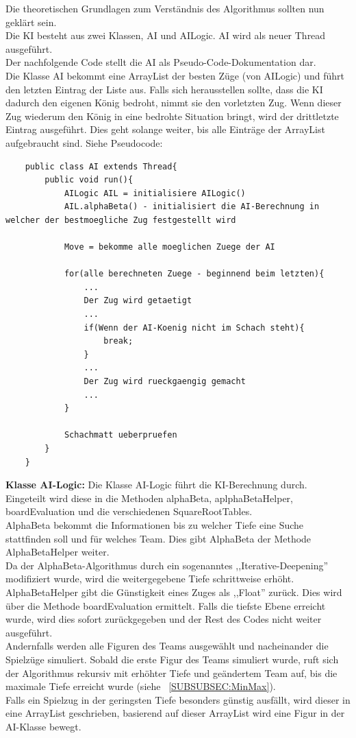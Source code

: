 \documentclass[12pt,a4paper]{article}
\begin{document}
Die theoretischen Grundlagen zum Verständnis des Algorithmus sollten nun geklärt sein.\\
Die KI besteht aus zwei Klassen, AI und AILogic. AI wird als neuer Thread ausgeführt. \\
Der nachfolgende Code stellt die AI als Pseudo-Code-Dokumentation dar.\\
Die Klasse AI bekommt eine ArrayList der besten Züge (von AILogic) und führt den letzten Eintrag der Liste aus. Falls sich herausstellen sollte, dass die KI dadurch den eigenen König bedroht, nimmt sie den vorletzten Zug. Wenn dieser Zug wiederum den König in eine bedrohte Situation bringt, wird der drittletzte Eintrag ausgeführt. Dies geht solange weiter, bis alle Einträge der ArrayList aufgebraucht sind. Siehe Pseudocode:

\lstset{language=Java}
\begin{lstlisting}
	public class AI extends Thread{
		public void run(){
			AILogic AIL = initialisiere AILogic()
			AIL.alphaBeta() - initialisiert die AI-Berechnung in welcher der bestmoegliche Zug festgestellt wird
			
			Move = bekomme alle moeglichen Zuege der AI
			
			for(alle berechneten Zuege - beginnend beim letzten){
				...
				Der Zug wird getaetigt
				...
				if(Wenn der AI-Koenig nicht im Schach steht){					
					break;
				}
				...
				Der Zug wird rueckgaengig gemacht
				...
			}
			
			Schachmatt ueberpruefen
		}
	}	
\end{lstlisting}
\newpage
\textbf{Klasse AI-Logic:} Die Klasse AI-Logic führt die KI-Berechnung durch. Eingeteilt wird diese in die Methoden alphaBeta, aplphaBetaHelper, boardEvaluation und die verschiedenen SquareRootTables.\\
AlphaBeta bekommt die Informationen bis zu welcher Tiefe eine Suche stattfinden soll und für welches Team. Dies gibt AlphaBeta der Methode AlphaBetaHelper weiter. \\
 Da der AlphaBeta-Algorithmus durch ein sogenanntes ,,Iterative-Deepening'' modifiziert wurde, wird die weitergegebene Tiefe schrittweise erhöht. \\
 AlphaBetaHelper gibt die Günstigkeit eines Zuges als ,,Float'' zurück. Dies wird über die Methode boardEvaluation ermittelt. Falls die tiefste Ebene erreicht wurde, wird dies sofort zurückgegeben und der Rest des Codes nicht weiter ausgeführt. \\
 Andernfalls werden alle Figuren des Teams ausgewählt und nacheinander die Spielzüge simuliert. Sobald die erste Figur des Teams simuliert wurde, ruft sich der Algorithmus rekursiv mit erhöhter Tiefe und geändertem Team auf, bis die maximale Tiefe erreicht wurde (siehe ~\ref{SUBSUBSEC:MinMax}). \\
 Falls ein Spielzug in der geringsten Tiefe besonders günstig ausfällt, wird dieser in eine ArrayList geschrieben, basierend auf dieser ArrayList wird eine Figur in der AI-Klasse bewegt. \\
 
\end{document}

